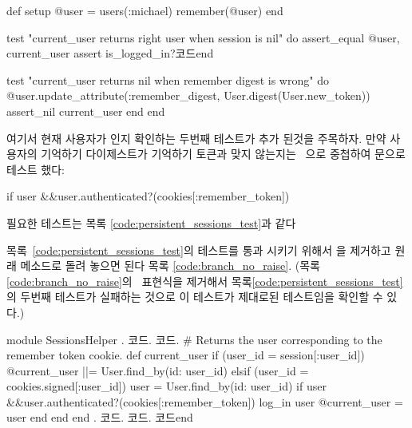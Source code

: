 {{\begin{codelisting}
\begin{code}
def setup @user = users(:michael) remember(@user) end 

test "current_user returns right user when session is nil" do assert_equal @user, current_user assert is_logged_in?코드end 

test "current_user returns nil when remember digest is wrong" do @user.update_attribute(:remember_digest, User.digest(User.new_token)) assert_nil current_user end end \end{code} \end{codelisting} 

\noindent 여기서 현재 사용자가 인지 확인하는 두번째 테스트가 추가 된것을 주목하자. 만약 사용자의 기억하기 다이제스트가 기억하기 토큰과 맞지 않는지는 \ 으로 중첩하여  문으로 테스트 했다: 

\begin{code} if user &&user.authenticated?(cookies[:remember_token]) \end{code} 

필요한 테스트는 목록 \ref{code:persistent_sessions_test}과 같다 

\begin{codelisting}  

 \end{codelisting} 

목록~\ref{code:persistent_sessions_test}의 테스트를 통과 시키기 위해서 을 제거하고 원래  메소드로 돌려 놓으면 된다 목록 \ref{code:branch_no_raise}. (목록 \ref{code:branch_no_raise}의 \  표현식을 제거해서 목록\ref{code:persistent_sessions_test}의 두번째 테스트가 실패하는 것으로 이 테스트가 제대로된 테스트임을 확인할 수 있다.) 

\begin{codelisting} \label{code:branch_no_raise}  

\begin{code} module SessionsHelper . 코드. 코드. # Returns the user corresponding to the remember token cookie. def current_user if (user_id = session[:user_id]) @current_user ||= User.find_by(id: user_id) elsif (user_id = cookies.signed[:user_id]) user = User.find_by(id: user_id) if user &&user.authenticated?(cookies[:remember_token]) log_in user @current_user = user end end end . 코드. 코드. 코드end \end{code} \end{codelisting} 

}}
